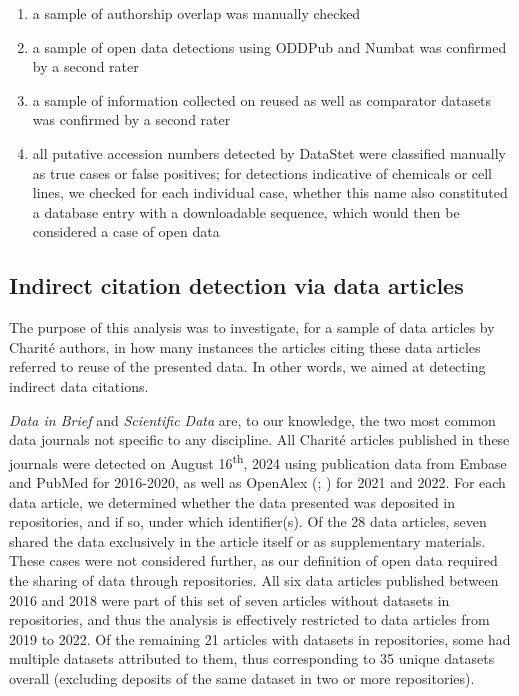 \documentclass[
  letterpaper,
  DIV=11,
  numbers=noendperiod]{scrartcl}
\providecommand{\tightlist}{%
  \setlength{\itemsep}{0pt}\setlength{\parskip}{0pt}}\usepackage{longtable,booktabs,array}
\begin{document}
\begin{enumerate}
\def\labelenumi{\arabic{enumi}.}
\tightlist
\item
  a sample of authorship overlap was manually checked
\item
  a sample of open data detections using ODDPub and Numbat was confirmed
  by a second rater
\item
  a sample of information collected on reused as well as comparator
  datasets was confirmed by a second rater
\item
  all putative accession numbers detected by DataStet were classified
  manually as true cases or false positives; for detections indicative
  of chemicals or cell lines, we checked for each individual case,
  whether this name also constituted a database entry with a
  downloadable sequence, which would then be considered a case of open
  data
\end{enumerate}

\subsection{Indirect citation detection via data
articles}\label{sec-methods-charite-data-articles}

The purpose of this analysis was to investigate, for a sample of data
articles by Charité authors, in how many instances the articles citing
these data articles referred to reuse of the presented data. In other
words, we aimed at detecting indirect data citations.

\emph{Data in Brief} and \emph{Scientific Data} are, to our knowledge,
the two most common data journals not specific to any discipline. All
Charité articles published in these journals were detected on August
16\textsuperscript{th}, 2024 using publication data from Embase and
PubMed for 2016-2020, as well as OpenAlex
(; ) for 2021 and 2022.
For each data article, we determined whether the data presented was
deposited in repositories, and if so, under which identifier(s). Of the
28 data articles, seven shared the data exclusively in the article
itself or as supplementary materials. These cases were not considered
further, as our definition of open data required the sharing of data
through repositories. All six data articles published between 2016 and
2018 were part of this set of seven articles without datasets in
repositories, and thus the analysis is effectively restricted to data
articles from 2019 to 2022. Of the remaining 21 articles with datasets
in repositories, some had multiple datasets attributed to them, thus
corresponding to 35 unique datasets overall (excluding deposits of the
same dataset in two or more repositories).
\end{document}
